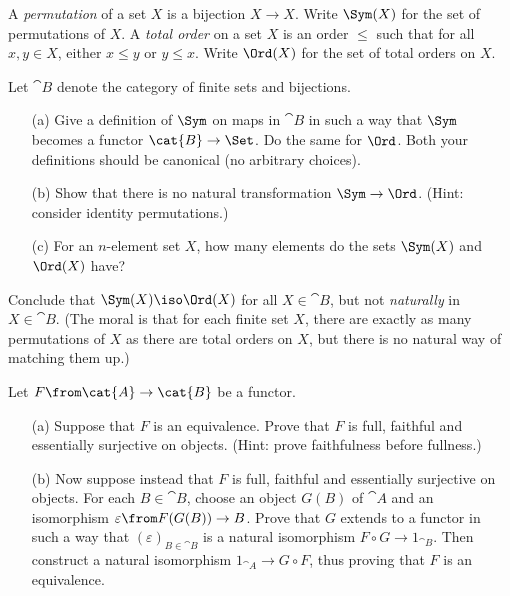\begin{exercise}
A \emph{permutation} of a set $X$ is a bijection $X \to X$.
Write $\Sym(X)$ for the set of permutations of $X$.
A \emph{total order} on a set $X$ is an order $\leq$ such that for all $x, y \in X$,
either $x \leq y$ or $y \leq x$.
Write $\Ord(X)$ for the set of total orders on $X$.

Let $\cat{B}$ denote the category of finite sets and bijections.

        \begin{itemize}
        \item[(a)]
Give a definition of $\Sym$ on maps in $\cat{B}$ in such a way that $\Sym$
becomes a functor $\cat{B} \to \Set$.  Do the same for $\Ord$.  Both your
definitions should be canonical (no arbitrary choices).

        \item[(b)]
Show that there is no natural transformation $\Sym \to \Ord$.
(Hint: consider identity permutations.)

        \item[(c)]
For an $n$-element set $X$, how many elements do the sets $\Sym(X)$
and $\Ord(X)$ have?
        \end{itemize}

Conclude that $\Sym(X) \iso \Ord(X)$ for all $X \in \cat{B}$, but not
\emph{naturally} in $X \in \cat{B}$.  (The moral is that for each finite
set $X$, there are exactly as many permutations of $X$ as there are total
orders on $X$, but there is no natural way of matching them up.)
\end{exercise}

\begin{exercise}
Let $F\from \cat{A} \to \cat{B}$ be a functor.

        \begin{itemize}
        \item[(a)]
Suppose that $F$ is an equivalence.  Prove that $F$ is full, faithful and
essentially surjective on objects.  (Hint: prove faithfulness before
fullness.)

        \item[(b)]
Now suppose instead that $F$ is full, faithful and essentially surjective
on objects.  For each $B \in \cat{B}$, choose an object $G(B)$ of $\cat{A}$
and an isomorphism $\varepsilon\from F(G(B)) \to B$.  Prove that $G$ extends
to a functor in such a way that $(\varepsilon)_{B \in \cat{B}}$ is a natural
isomorphism $F \circ G \to 1_{\cat{B}}$.  Then construct a natural isomorphism
$1_{\cat{A}} \to G \circ F$, thus proving that $F$ is an equivalence.
        \end{itemize}
\end{exercise}

